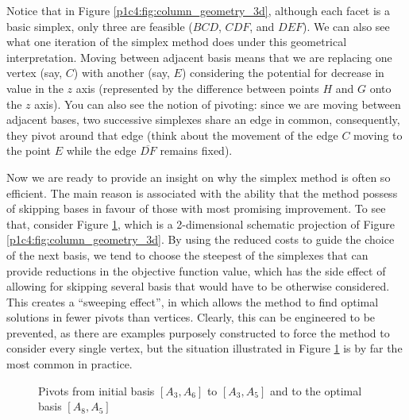 Notice that in Figure \ref{p1c4:fig:column_geometry_3d}, although each facet is a basic simplex, only three are feasible ($BCD$, $CDF$, and $DEF$). We can also see what one iteration of the simplex method does under this geometrical interpretation. Moving between adjacent basis means that we are replacing one vertex (say, $C$) with another (say, $E$) considering the potential for decrease in value in the $z$ axis (represented by the difference between points $H$ and $G$ onto the $z$ axis). You can also see the notion of pivoting: since we are moving between adjacent bases, two successive simplexes share an edge in common, consequently, they pivot around that edge (think about the movement of the edge $C$ moving to the point $E$ while the edge $\overline{DF}$ remains fixed).

Now we are ready to provide an insight on why the simplex method is often so efficient. The main reason is associated with the ability that the method possess of skipping bases in favour of those with most promising improvement. To see that, consider Figure \ref{p1c4:fig:column_geometry_projection}, which is a 2-dimensional schematic projection of Figure \ref{p1c4:fig:column_geometry_3d}. By using the reduced costs to guide the choice of the next basis, we tend to choose the steepest of the simplexes that can provide reductions in the objective function value, which has the side effect of allowing for skipping several basis that would have to be otherwise considered. This creates a ``sweeping effect'', in which allows the method to find optimal solutions in fewer pivots than vertices. Clearly, this can be engineered to be prevented, as there are examples purposely constructed to force the method to consider every single vertex, but the situation illustrated in Figure \ref{p1c4:fig:column_geometry_projection} is by far the most common in practice.  


\begin{figure}[h]
	\caption{Pivots from initial basis $[A_3, A_6]$ to $[A_3, A_5]$ and to the optimal basis $[A_8, A_5]$} \label{p1c4:fig:column_geometry_projection}
\end{figure}		
 

